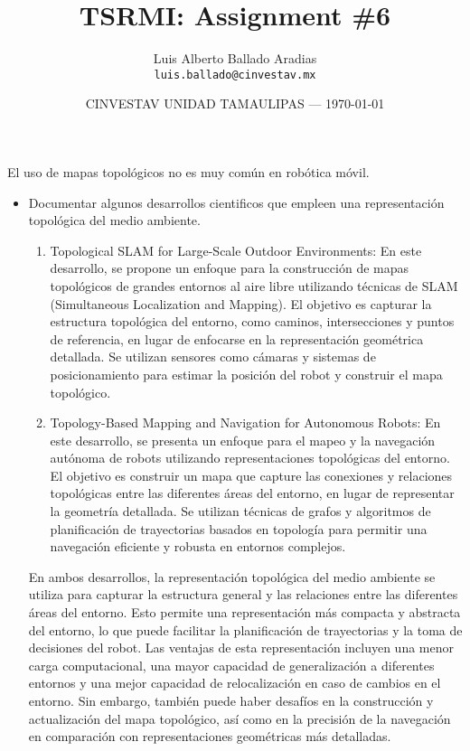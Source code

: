 \documentclass{article}
\title{TSRMI: Assignment \#6} %
\author{Luis Alberto Ballado Aradias\\ \texttt{luis.ballado@cinvestav.mx}} %
\date{CINVESTAV UNIDAD TAMAULIPAS --- \today} %
\begin{document}
\maketitle %

El uso de mapas topológicos no es muy común en robótica móvil.\\

\begin{itemize} %
\item Documentar algunos desarrollos cientificos que empleen una representación topológica del medio ambiente.

  \begin{enumerate}
  \item Topological SLAM for Large-Scale Outdoor Environments: En este desarrollo, se propone un enfoque para la construcción de mapas topológicos de grandes entornos al aire libre utilizando técnicas de SLAM (Simultaneous Localization and Mapping). El objetivo es capturar la estructura topológica del entorno, como caminos, intersecciones y puntos de referencia, en lugar de enfocarse en la representación geométrica detallada. Se utilizan sensores como cámaras y sistemas de posicionamiento para estimar la posición del robot y construir el mapa topológico.
  \item Topology-Based Mapping and Navigation for Autonomous Robots: En este desarrollo, se presenta un enfoque para el mapeo y la navegación autónoma de robots utilizando representaciones topológicas del entorno. El objetivo es construir un mapa que capture las conexiones y relaciones topológicas entre las diferentes áreas del entorno, en lugar de representar la geometría detallada. Se utilizan técnicas de grafos y algoritmos de planificación de trayectorias basados en topología para permitir una navegación eficiente y robusta en entornos complejos.
    
  \end{enumerate}

  En ambos desarrollos, la representación topológica del medio ambiente se utiliza para capturar la estructura general y las relaciones entre las diferentes áreas del entorno. Esto permite una representación más compacta y abstracta del entorno, lo que puede facilitar la planificación de trayectorias y la toma de decisiones del robot. Las ventajas de esta representación incluyen una menor carga computacional, una mayor capacidad de generalización a diferentes entornos y una mejor capacidad de relocalización en caso de cambios en el entorno. Sin embargo, también puede haber desafíos en la construcción y actualización del mapa topológico, así como en la precisión de la navegación en comparación con representaciones geométricas más detalladas.
    

\end{itemize}
\end{document}
